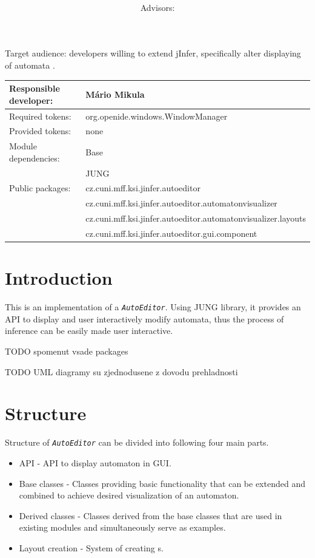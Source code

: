 \documentclass[a4paper,10pt,oneside]{article}
\title{\bf\mftitle}
\author{\mfauthor \\ Advisors: \mfadvisor}
\date{\mfplacedate}
\newcommand{\code}[1]{\texttt{\StrSubstitute{#1}{.}{.\.}}}
\def\.{\discretionary{}{}{}}
\newcommand{\jmodule}[1]{\texttt{\textit{#1}}}
\begin{document}
\maketitle
\noindent Target audience: developers willing to extend jInfer, specifically alter displaying of automata .

\noindent \begin{tabular}{|l|l|} \hline
Responsible developer: & Mário Mikula \\ \hline
Required tokens:       & org.openide.windows.WindowManager \\ \hline
Provided tokens:       & none \\ \hline
Module dependencies:   & Base \\ 
					   & JUNG \\ \hline
Public packages:       & cz.cuni.mff.ksi.jinfer.autoeditor \\ 
					   & cz.cuni.mff.ksi.jinfer.autoeditor.automatonvisualizer \\
   					   & cz.cuni.mff.ksi.jinfer.autoeditor.automatonvisualizer.layouts \\
   					   & cz.cuni.mff.ksi.jinfer.autoeditor.gui.component \\ \hline
\end{tabular}

\section{Introduction}

This is an implementation of a \jmodule{AutoEditor}. Using JUNG library, it provides an API to display and user interactively modify automata, thus the process of inference can be easily made user interactive.

TODO spomenut vsade packages

TODO UML diagramy su zjednodusene z dovodu prehladnosti

\section{Structure}

Structure of \jmodule{AutoEditor} can be divided into following four main parts.

\begin{itemize}
	\item API - API to display automaton in GUI.
	\item Base classes - Classes providing basic functionality that can be extended and combined to achieve desired visualization of an automaton.
	\item Derived classes - Classes derived from the base classes that are used in existing modules and simultaneously serve as examples.
	\item Layout creation - System of creating \code{Layout}s.
\end{itemize}
\end{document}
